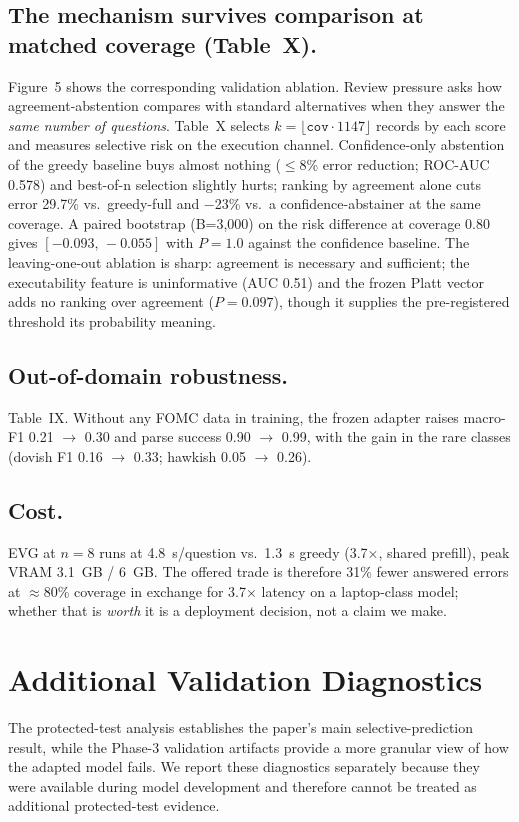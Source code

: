 \documentclass[conference]{IEEEtran}
\begin{document}
\subsection{The mechanism survives comparison at matched coverage (Table~X).}
Figure~5 shows the corresponding validation ablation. Review pressure asks how agreement-abstention compares with standard alternatives when
they answer the \emph{same number of questions}. Table~X selects $k =
\lfloor \mathtt{cov}\cdot 1147\rfloor$ records by each score and measures selective risk on
the execution channel. Confidence-only abstention of the greedy baseline buys almost nothing
($\le$8\% error reduction; ROC-AUC 0.578) and best-of-n selection slightly hurts; ranking by
agreement alone cuts error 29.7\% vs.\ greedy-full and $-$23\% vs.\ a confidence-abstainer at
the same coverage. A paired bootstrap (B=3{,}000) on the risk difference at coverage 0.80
gives $[-0.093,\,-0.055]$ with $P=1.0$ against the confidence baseline. The leaving-one-out
ablation is sharp: agreement is necessary and sufficient; the executability feature is
uninformative (AUC 0.51) and the frozen Platt vector adds no ranking over agreement
($P{=}0.097$), though it supplies the pre-registered threshold its probability meaning.

\subsection{Out-of-domain robustness.}
Table~IX. Without any FOMC data in training, the frozen adapter raises macro-F1
0.21 $\rightarrow$ 0.30 and parse success 0.90 $\rightarrow$ 0.99, with the gain in the
rare classes (dovish F1 0.16 $\rightarrow$ 0.33; hawkish 0.05 $\rightarrow$ 0.26).

\subsection{Cost.} EVG at $n=8$ runs at 4.8~s/question vs.\ 1.3~s greedy (3.7$\times$,
shared prefill), peak VRAM 3.1~GB / 6~GB. The offered trade is therefore 31\% fewer
answered errors at $\approx$80\% coverage in exchange for 3.7$\times$ latency on a laptop-class
model; whether that is \emph{worth} it is a deployment decision, not a claim we make.

\section{Additional Validation Diagnostics}
\label{sec:diagnostics}
The protected-test analysis establishes the paper's main selective-prediction result, while
the Phase-3 validation artifacts provide a more granular view of how the adapted model
fails. We report these diagnostics separately because they were available during model
development and therefore cannot be treated as additional protected-test evidence.
\end{document}
